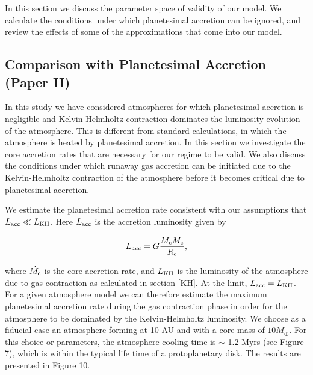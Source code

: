 \documentclass[apj]{emulateapj}
\begin{document}
In this section we discuss the parameter space of validity of our model. We calculate the conditions under which planetesimal accretion can be ignored, and review the effects of some of the approximations that come into our model.

\subsection{Comparison with Planetesimal Accretion \textbf{(Paper II)}}
\label{acc}

In this study we have considered atmospheres for which planetesimal accretion is negligible and Kelvin-Helmholtz contraction dominates the luminosity evolution of the atmosphere. This is different from standard calculations, in which the atmosphere is heated by planetesimal accretion. In this section we investigate the core accretion rates that are necessary for our regime to be valid. We also discuss the conditions under which runaway gas accretion can be initiated due to the Kelvin-Helmholtz contraction of the atmosphere before it becomes critical due to planetesimal accretion.

We estimate the planetesimal accretion rate consistent with our assumptions that $L_{\mathrm{acc}} \ll L_{\rm{KH}}$. Here $L_{\rm{acc}}$ is the accretion luminosity given by

\begin{equation}
\label{eq:Lacc}
L_{acc}=G \frac{M_{\rm{c}} \dot{M_{\rm{c}}}}{R_{\rm{c}}},
\end{equation}

\noindent where $\dot{M_{\rm{c}}}$ is the core accretion rate, and $L_{\rm{KH}}$ is the luminosity of the atmosphere due to gas contraction as calculated in section \ref{KH}. At the limit, $L_{\rm{acc}}=L_{\rm{KH}}$. For a given atmosphere model we can therefore estimate the maximum planetesimal accretion rate during the gas contraction phase in order for the atmosphere to be dominated by the Kelvin-Helmholtz luminosity. We choose as a fiducial case an atmosphere forming at 10 AU and with a core mass of $10 M_{\oplus}$. For this choice or parameters, the atmosphere cooling time is $\sim$ 1.2 Myrs (see Figure 7), which is within the typical life time of a protoplanetary disk. The results are presented in Figure 10. 
\end{document}
